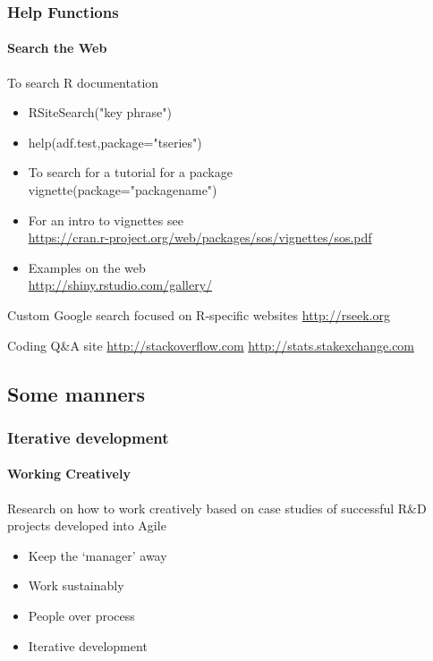 \documentclass[12pt]{beamer}\usepackage[]{graphicx}\usepackage[]{color}
\begin{document}
\begin{frame}
  \frametitle{Help Functions}
  \framesubtitle{Search the Web}
\begin{block}{To search R documentation}
\begin{itemize}
\item RSiteSearch("key phrase")
\item help(adf.test,package="tseries")
\item To search for a tutorial for a package\\
 vignette(package="packagename")
\item For an intro to vignettes see\\
\url{https://cran.r-project.org/web/packages/sos/vignettes/sos.pdf}
\item Examples on the web\\
\url{http://shiny.rstudio.com/gallery/}
\end{itemize}
\end{block}
\begin{block}{Custom Google search focused on R-specific websites}
\url{http://rseek.org}
\end{block}

\begin{block}{Coding Q\&A site}
\url{http://stackoverflow.com}
\url{http://stats.stakexchange.com}
\end{block}

\end{frame}

\subsection*{Some manners}
\begin{frame}
  \frametitle{Iterative development}
  \framesubtitle{Working Creatively}
Research on how to work creatively based on case studies of  successful R\&D projects developed into Agile
\begin{itemize}
\item Keep the `manager' away
\item Work sustainably
\item People over process
\item Iterative development
\end{itemize}
\end{frame}
\end{document}
